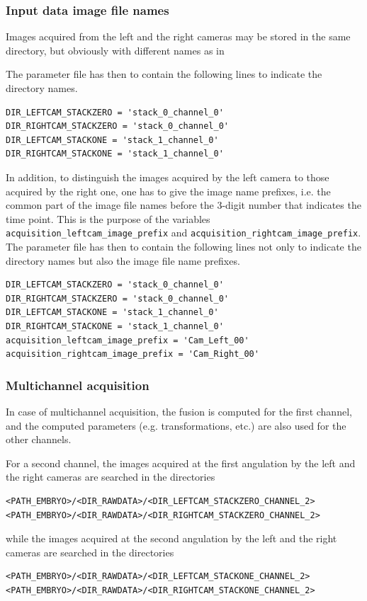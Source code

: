 \subsubsection{Input data image file names}

Images acquired from the left and the right cameras may be stored in
the same directory, but obviously with different names as in 

\mbox{}
\mbox{}

The parameter file has then to contain the following lines to indicate
the directory names.
\begin{verbatim}
DIR_LEFTCAM_STACKZERO = 'stack_0_channel_0'
DIR_RIGHTCAM_STACKZERO = 'stack_0_channel_0'
DIR_LEFTCAM_STACKONE = 'stack_1_channel_0'
DIR_RIGHTCAM_STACKONE = 'stack_1_channel_0'
\end{verbatim}

In addition, to distinguish the images acquired by the left camera to
those acquired by the right one, one has to give the image name
prefixes, i.e. the common part of the image file names before the
3-digit number that indicates the time point.
This is the purpose of the  variables
\verb|acquisition_leftcam_image_prefix| and 
\verb|acquisition_rightcam_image_prefix|.
The parameter file has then to contain the following lines not only to indicate
the directory names but also the image file name prefixes.

\begin{verbatim}
DIR_LEFTCAM_STACKZERO = 'stack_0_channel_0'
DIR_RIGHTCAM_STACKZERO = 'stack_0_channel_0'
DIR_LEFTCAM_STACKONE = 'stack_1_channel_0'
DIR_RIGHTCAM_STACKONE = 'stack_1_channel_0'
acquisition_leftcam_image_prefix = 'Cam_Left_00'
acquisition_rightcam_image_prefix = 'Cam_Right_00'
\end{verbatim}

\subsubsection{Multichannel acquisition}

In case of multichannel acquisition, the fusion is computed for the
first channel, and the computed parameters (e.g. transformations,
etc.) are also used for the other channels. 

For a second channel, 
the images acquired at the first angulation by the
left and the right cameras are searched in the directories
\begin{verbatim}
<PATH_EMBRYO>/<DIR_RAWDATA>/<DIR_LEFTCAM_STACKZERO_CHANNEL_2>
<PATH_EMBRYO>/<DIR_RAWDATA>/<DIR_RIGHTCAM_STACKZERO_CHANNEL_2>
\end{verbatim}
while the images acquired at the second angulation by the
left and the right cameras are searched in the directories
\begin{verbatim}
<PATH_EMBRYO>/<DIR_RAWDATA>/<DIR_LEFTCAM_STACKONE_CHANNEL_2>
<PATH_EMBRYO>/<DIR_RAWDATA>/<DIR_RIGHTCAM_STACKONE_CHANNEL_2>
\end{verbatim}


